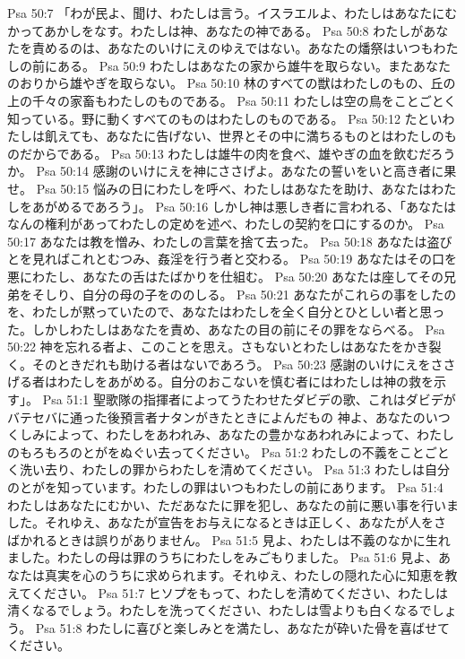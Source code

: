 Psa 50:7  「わが民よ、聞け、わたしは言う。イスラエルよ、わたしはあなたにむかってあかしをなす。わたしは神、あなたの神である。
Psa 50:8  わたしがあなたを責めるのは、あなたのいけにえのゆえではない。あなたの燔祭はいつもわたしの前にある。
Psa 50:9  わたしはあなたの家から雄牛を取らない。またあなたのおりから雄やぎを取らない。
Psa 50:10  林のすべての獣はわたしのもの、丘の上の千々の家畜もわたしのものである。
Psa 50:11  わたしは空の鳥をことごとく知っている。野に動くすべてのものはわたしのものである。
Psa 50:12  たといわたしは飢えても、あなたに告げない、世界とその中に満ちるものとはわたしのものだからである。
Psa 50:13  わたしは雄牛の肉を食べ、雄やぎの血を飲むだろうか。
Psa 50:14  感謝のいけにえを神にささげよ。あなたの誓いをいと高き者に果せ。
Psa 50:15  悩みの日にわたしを呼べ、わたしはあなたを助け、あなたはわたしをあがめるであろう」。
Psa 50:16  しかし神は悪しき者に言われる、「あなたはなんの権利があってわたしの定めを述べ、わたしの契約を口にするのか。
Psa 50:17  あなたは教を憎み、わたしの言葉を捨て去った。
Psa 50:18  あなたは盗びとを見ればこれとむつみ、姦淫を行う者と交わる。
Psa 50:19  あなたはその口を悪にわたし、あなたの舌はたばかりを仕組む。
Psa 50:20  あなたは座してその兄弟をそしり、自分の母の子をののしる。
Psa 50:21  あなたがこれらの事をしたのを、わたしが黙っていたので、あなたはわたしを全く自分とひとしい者と思った。しかしわたしはあなたを責め、あなたの目の前にその罪をならべる。
Psa 50:22  神を忘れる者よ、このことを思え。さもないとわたしはあなたをかき裂く。そのときだれも助ける者はないであろう。
Psa 50:23  感謝のいけにえをささげる者はわたしをあがめる。自分のおこないを慎む者にはわたしは神の救を示す」。
Psa 51:1  聖歌隊の指揮者によってうたわせたダビデの歌、これはダビデがバテセバに通った後預言者ナタンがきたときによんだもの 神よ、あなたのいつくしみによって、わたしをあわれみ、あなたの豊かなあわれみによって、わたしのもろもろのとがをぬぐい去ってください。
Psa 51:2  わたしの不義をことごとく洗い去り、わたしの罪からわたしを清めてください。
Psa 51:3  わたしは自分のとがを知っています。わたしの罪はいつもわたしの前にあります。
Psa 51:4  わたしはあなたにむかい、ただあなたに罪を犯し、あなたの前に悪い事を行いました。それゆえ、あなたが宣告をお与えになるときは正しく、あなたが人をさばかれるときは誤りがありません。
Psa 51:5  見よ、わたしは不義のなかに生れました。わたしの母は罪のうちにわたしをみごもりました。
Psa 51:6  見よ、あなたは真実を心のうちに求められます。それゆえ、わたしの隠れた心に知恵を教えてください。
Psa 51:7  ヒソプをもって、わたしを清めてください、わたしは清くなるでしょう。わたしを洗ってください、わたしは雪よりも白くなるでしょう。
Psa 51:8  わたしに喜びと楽しみとを満たし、あなたが砕いた骨を喜ばせてください。
